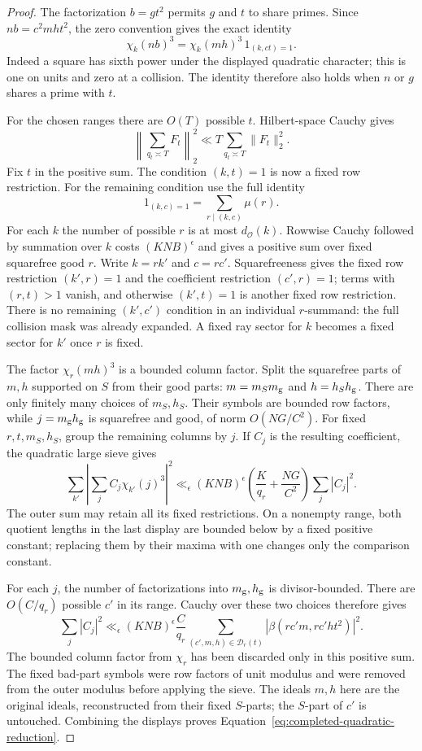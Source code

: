 \documentclass[11pt,a4paper]{article}
\numberwithin{equation}{section}
\numberwithin{figure}{section}
\theoremstyle{definition}
\theoremstyle{remark}
\begin{document}
\begin{proof}
The factorization $b=gt^2$ permits $g$ and $t$ to share primes.  Since
$nb=c^2mht^2$, the zero convention gives the exact identity
\begin{equation}\label{eq:completed-quadratic-zero-mask}
 \chi_k(nb)^3=\chi_k(mh)^3\,1_{(k,ct)=1}.
\end{equation}
Indeed a square has sixth power under the displayed quadratic character;
this is one on units and zero at a collision.  The identity therefore also
holds when $n$ or $g$ shares a prime with $t$.

For the chosen ranges there are $O(T)$ possible $t$.  Hilbert-space Cauchy
gives
\[
 \left\|\sum_{q_t\asymp T}F_t\right\|_2^2
 \ll T\sum_{q_t\asymp T}\|F_t\|_2^2.
\]
Fix $t$ in the positive sum.  The condition $(k,t)=1$ is now a fixed row
restriction.  For the remaining condition use the full identity
\[
 1_{(k,c)=1}=\sum_{r\mid(k,c)}\mu(r).
\]
For each $k$ the number of possible $r$ is at most $d_{\mathcal O}(k)$.
Rowwise Cauchy followed by summation over $k$ costs $(KNB)^\epsilon$
and gives a positive sum over fixed squarefree good $r$.  Write
$k=rk'$ and $c=rc'$.  Squarefreeness gives the fixed row restriction
$(k',r)=1$ and the coefficient restriction $(c',r)=1$; terms with
$(r,t)>1$ vanish, and otherwise $(k',t)=1$ is another fixed row restriction.
There is no remaining $(k',c')$ condition in an individual $r$-summand:
the full collision mask was already expanded.  A fixed ray sector for $k$
becomes a fixed sector for $k'$ once $r$ is fixed.

The factor $\chi_r(mh)^3$ is a bounded column factor.  Split the squarefree
parts of $m,h$ supported on $S$ from their good parts:
$m=m_Sm_{\rm g}$ and $h=h_Sh_{\rm g}$.  There are only finitely many
choices of $m_S,h_S$.  Their symbols are bounded row factors, while
$j=m_{\rm g}h_{\rm g}$ is squarefree and good, of norm $O(NG/C^2)$.
For fixed $r,t,m_S,h_S$, group the remaining columns by $j$.  If $C_j$
is the resulting coefficient, the quadratic large sieve gives
\[
 \sum_{k'}\left|\sum_j C_j\chi_{k'}(j)^3\right|^2
 \ll_\epsilon (KNB)^\epsilon
       \left(\frac K{q_r}+\frac{NG}{C^2}\right)\sum_j|C_j|^2.
\]
The outer sum may retain all its fixed restrictions.  On a nonempty range,
both quotient lengths in the last display are bounded below by a fixed
positive constant; replacing them by their maxima with one changes only
the comparison constant.

For each $j$, the number of factorizations into $m_{\rm g},h_{\rm g}$ is
divisor-bounded.  There are $O(C/q_r)$ possible $c'$ in its range.  Cauchy
over these two choices therefore gives
\[
 \sum_j|C_j|^2
 \ll_\epsilon (KNB)^\epsilon\frac C{q_r}
 \sum_{(c',m,h)\in\mathcal D_r(t)}
          |\beta(rc'm,rc'ht^2)|^2.
\]
The bounded column factor from $\chi_r$ has been discarded only in this
positive sum.  The fixed bad-part symbols were row factors of unit modulus
and were removed from the outer modulus before applying the sieve.
The ideals $m,h$ here are the original ideals,
reconstructed from their fixed $S$-parts; the $S$-part of $c'$ is untouched.
Combining the displays proves Equation~\eqref{eq:completed-quadratic-reduction}.


\end{proof}
\end{document}
